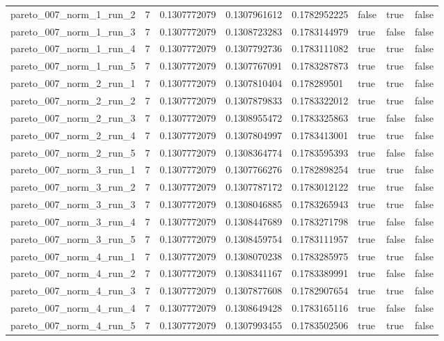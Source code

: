 \begin{tabular}{@{}llllllll@{}}
pareto\_007\_norm\_1\_run\_2 & 7 & 0.1307772079 & 0.1307961612 & 0.1782952225 & false & true & false \\
pareto\_007\_norm\_1\_run\_3 & 7 & 0.1307772079 & 0.1308723283 & 0.1783144979 & true & false & false \\
pareto\_007\_norm\_1\_run\_4 & 7 & 0.1307772079 & 0.1307792736 & 0.1783111082 & true & true & false \\
pareto\_007\_norm\_1\_run\_5 & 7 & 0.1307772079 & 0.1307767091 & 0.1783287873 & true & true & false \\
pareto\_007\_norm\_2\_run\_1 & 7 & 0.1307772079 & 0.1307810404 & 0.178289501 & true & true & false \\
pareto\_007\_norm\_2\_run\_2 & 7 & 0.1307772079 & 0.1307879833 & 0.1783322012 & true & true & false \\
pareto\_007\_norm\_2\_run\_3 & 7 & 0.1307772079 & 0.1308955472 & 0.1783325863 & true & false & false \\
pareto\_007\_norm\_2\_run\_4 & 7 & 0.1307772079 & 0.1307804997 & 0.1783413001 & true & true & false \\
pareto\_007\_norm\_2\_run\_5 & 7 & 0.1307772079 & 0.1308364774 & 0.1783595393 & true & false & false \\
pareto\_007\_norm\_3\_run\_1 & 7 & 0.1307772079 & 0.1307766276 & 0.1782898254 & true & true & false \\
pareto\_007\_norm\_3\_run\_2 & 7 & 0.1307772079 & 0.1307787172 & 0.1783012122 & true & true & false \\
pareto\_007\_norm\_3\_run\_3 & 7 & 0.1307772079 & 0.1308046885 & 0.1783265943 & true & true & false \\
pareto\_007\_norm\_3\_run\_4 & 7 & 0.1307772079 & 0.1308447689 & 0.1783271798 & true & false & false \\
pareto\_007\_norm\_3\_run\_5 & 7 & 0.1307772079 & 0.1308459754 & 0.1783111957 & true & false & false \\
pareto\_007\_norm\_4\_run\_1 & 7 & 0.1307772079 & 0.1308070238 & 0.1783285975 & true & true & false \\
pareto\_007\_norm\_4\_run\_2 & 7 & 0.1307772079 & 0.1308341167 & 0.1783389991 & true & false & false \\
pareto\_007\_norm\_4\_run\_3 & 7 & 0.1307772079 & 0.1307877608 & 0.1782907654 & true & true & false \\
pareto\_007\_norm\_4\_run\_4 & 7 & 0.1307772079 & 0.1308649428 & 0.1783165116 & true & false & false \\
pareto\_007\_norm\_4\_run\_5 & 7 & 0.1307772079 & 0.1307993455 & 0.1783502506 & true & true & false \\

\end{tabular}
